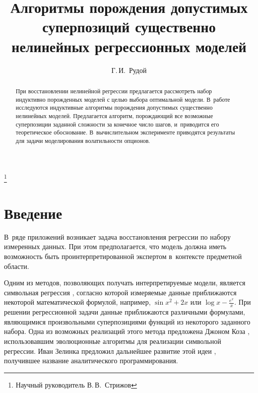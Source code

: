 \documentclass[12pt,a4paper]{amsart}
\begin{document}
\pagestyle{plain}
\lstset{language=C++}

\title{Алгоритмы порождения допустимых суперпозиций существенно нелинейных регрессионных моделей}
\author{Г.\,И.~Рудой}
\address{Московский физико-технический институт, ФУПМ, каф. <<Интеллектуальные системы>>}
\thanks{Научный руководитель В.\,В.~Стрижов}

\begin{abstract}
  При восстановлении нелинейной регрессии предлагается рассмотреть набор
  индуктивно порожденных моделей с целью выбора оптимальной модели. В~работе
  исследуются индуктивные алгоритмы порождения допустимых существенно
  нелинейных моделей. Предлагается алгоритм, порождающий все возможные
  суперпозиции заданной сложности за конечное число шагов, и~приводится его
  теоретическое обоснование. В~вычислительном эксперименте приводятся
  результаты для задачи моделирования волатильности опционов.
\end{abstract}

\maketitle

\section{Введение}

В~ряде приложений \cite{Barmpalexis201175, Shi:2011:CRM, DOI:10.1504/IJCENT.2010.038358}
возникает задача восстановления регрессии по набору измеренных данных.
При этом предполагается, что модель должна иметь возможность быть
проинтерпретированной экспертом в~контексте предметной области.

Одним из методов, позволяющих получать интерпретируемые модели, является
символьная регрессия \cite{davidson:2000:snrea, reference/ml/X10vc},
согласно которой измеряемые данные приближаются некоторой математической
формулой, например, $ \sin x^2 + 2x $ или $\log x - \frac{e^x}{x} $.
При решении регрессионной задачи данные приближаются различными формулами,
являющимися произвольными суперпозициями функций из некоторого заданного
набора. Одна из возможных реализаций этого метода
предложена Джоном Коза \cite{Koza1998GP, Koza1998Intro}, использовавшим
эволюционные алгоритмы для реализации символьной регрессии. Иван Зелинка
предложил дальнейшее развитие этой идеи \cite{Zelinka2008}, получившее
название аналитического программирования.
\end{document}
